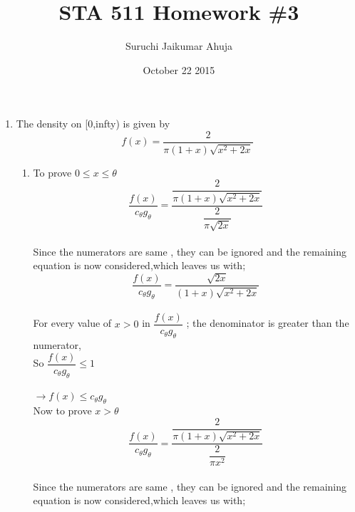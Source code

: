 \documentclass[letterpaper]{article}
\begin{document}
\title{STA 511 Homework \#3}
\date{October 22 2015}
\author{Suruchi Jaikumar Ahuja}
\maketitle

\begin{enumerate}

\item The density on [0,infty) is given by 
\begin{equation*}
          f(x)=\dfrac{2}{\pi(1+x) \sqrt{x^2+2x}}
\end{equation*}

\begin{enumerate}

\item 	To prove $0 \leq x \leq \theta $
\begin{equation*}
\dfrac{f(x)}{c_{\theta}g_{\theta}} =\dfrac{\dfrac{2}{\pi(1+x) \sqrt{x^2+2x}}}{\dfrac{2}{\pi\sqrt{2x}}}
\end{equation*}\\

Since the numerators are same , they can be ignored and the remaining equation is now considered,which leaves us with;\\

\begin{equation*}
\dfrac{f(x)}{c_{\theta}g_{\theta}} =\dfrac{\sqrt{2x}} {(1+x)\sqrt{x^2+2x}}
\end{equation*}\\

 For every value of $x > 0$ in $ \dfrac{f(x)}{c_{\theta}g_{\theta}}$ ; the denominator is greater than the numerator,\\

So $\dfrac{f(x)}{c_{\theta} g_{\theta}} \leq 1 $\\\\

$\rightarrow f(x) \leq c_{\theta} g_{\theta}$\\

Now to prove $ x > \theta $ \\
\begin{equation*}
\dfrac{f(x)}{c_{\theta}g_{\theta}} =\dfrac{\dfrac{2}{\pi(1+x) \sqrt{x^2+2x}}}{\dfrac{2}{\pi x^2}}
\end{equation*}\\

Since the numerators are same , they can be ignored and the remaining equation is now considered,which leaves us with;\\


\end{enumerate}
\end{enumerate}
\end{document}

